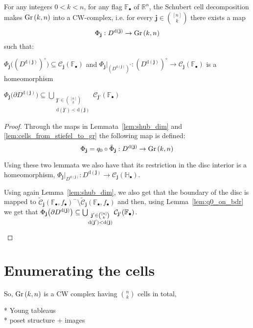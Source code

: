 \begin{theorem}\label{thm:cw_complex} For any integers $0<k<n$, for any flag $\mathbb{F}_{\bullet}$ of $\mathbb{R}^n$, the Schubert cell decomposition makes $\Gr{k}{n}$ into a CW-complex, i.e. for every $\mathbf{j}\in\binom{[n]}{k}$ there exists a map
\[\Phi_{\mathbf{j}}:D^{\mathrm{d}(\mathbf{j})}\to\Gr{k}{n}\]
such that:
\begin{i_enum} \item $\Phi_{\mathbf{j}}\big({\left(D^{\mathrm{d}(\mathbf{j})}\right)}^{\circ}\big)\subseteq\mathcal{C}_{\mathbf{j}}(\mathbb{F}_{\bullet})$ and $\Phi_{\mathbf{j}}|_{{\left(D^{\mathrm{d}(\mathbf{j})}\right)}^{\circ}}:{\left(D^{\mathrm{d}(\mathbf{j})}\right)}^{\circ}\to\mathcal{C}_{\mathbf{j}}(\mathbb{F}_{\bullet})$ is a homeomorphism
\item $\Phi_{\mathbf{j}}\big({\partial D^{\mathrm{d}(\mathbf{j})}}\big)\subseteq\bigcup_{\substack{\mathbf{j}'\in\binom{[n]}{k}\\\mathrm{d}(\mathbf{j}')<\mathrm{d}(\mathbf{j})}}\mathcal{C}_{\mathbf{j}'}(\mathbb{F}_{\bullet})$
\end{i_enum}
\end{theorem}
\begin{proof} Through the maps in Lemmata~\ref{lem:shub_dim} and \ref{lem:cells_from_stiefel_to_gr} the following map is defined:
\[\Phi_{\mathbf{j}}=q_0\circ\tilde{\Phi}_{\mathbf{j}}:D^{\mathrm{d}(\mathbf{j})}\to\Gr{k}{n}\]
\begin{i_enum}
\item Using these two lemmata we also have that its restriction in the disc interior is a homeomorphism,
$\Phi_{\mathbf{j}}|_{D^{\mathrm{d}(\mathbf{j})}}:D^{\mathrm{d}(\mathbf{j})}\to\mathcal{C}_{\mathbf{j}}(\mathbb{H}_{\bullet})$.
\item Using again Lemma~\ref{lem:shub_dim}, we also get that the boundary of the disc is mapped to $\tilde{\mathcal{C}}_{\mathbf{j}}(\mathbb{F}_{\bullet},f_{\bullet})^-\setminus\tilde{\mathcal{C}}_{\mathbf{j}}(\mathbb{F}_{\bullet},f_{\bullet})$ and then, using Lemma~\ref{lem:q0_on_bdr} we get that
$\Phi_{\mathbf{j}}\big({\partial D^{\mathrm{d}(\mathbf{j})}}\big)\subseteq\bigcup_{\substack{\mathbf{j}'\in\binom{[n]}{k}\\\mathrm{d}(\mathbf{j}')<\mathrm{d}(\mathbf{j})}}\mathcal{C}_{\mathbf{j}'}(\mathbb{F}_{\bullet})\qedhere$.
\end{i_enum}
\end{proof}

\section{Enumerating the cells}
So, $\Gr{k}{n}$ is a CW complex having $\binom{n}{k}$ cells in total,



* Young tableaus\\
* poset structure + images\\


